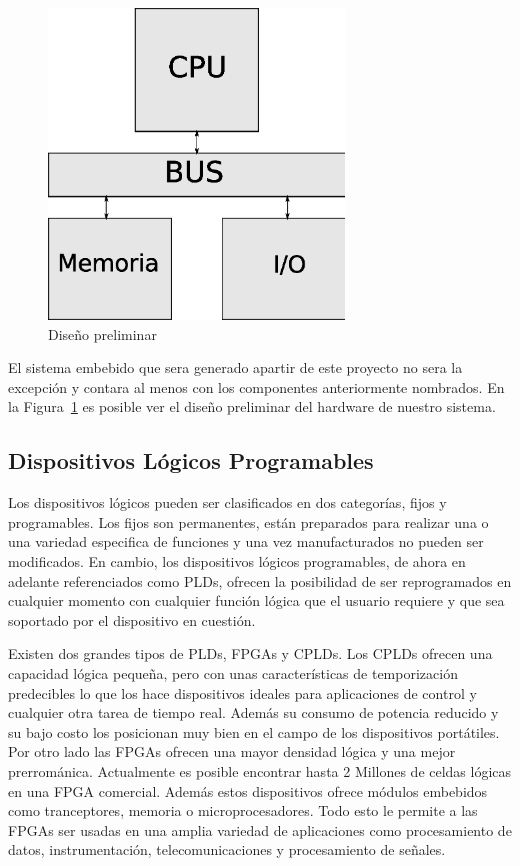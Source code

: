 \begin{figure}[h]
  \centering
	\includegraphics[width=0.70\textwidth]{2-sistema/graf/general.eps}
  \caption{Diseño preliminar}
  \label{figu:diseno}
\end{figure}

El sistema embebido que sera generado apartir de este proyecto no sera la excepción y contara al menos con los componentes anteriormente nombrados. En la Figura~\ref{figu:diseno} es posible ver el diseño preliminar del hardware de nuestro sistema.




\subsection{Dispositivos Lógicos Programables}
Los dispositivos lógicos pueden ser clasificados en dos categorías, fijos y programables. Los fijos son permanentes, están preparados para realizar una o una variedad especifica de funciones y una vez manufacturados no pueden ser modificados.
En cambio, los dispositivos lógicos programables, de ahora en adelante referenciados como PLDs, ofrecen la posibilidad de ser reprogramados en cualquier momento con cualquier función lógica que el usuario requiere y que sea soportado por el dispositivo en cuestión.	

Existen dos grandes tipos de PLDs, FPGAs y CPLDs. Los CPLDs ofrecen una capacidad lógica pequeña, pero con unas características de temporización predecibles lo que los hace dispositivos ideales para aplicaciones de control y cualquier otra tarea de tiempo real. Además su consumo de potencia reducido y su bajo costo los posicionan muy bien en el campo de los dispositivos portátiles.
Por otro lado las FPGAs ofrecen una mayor densidad lógica y una mejor prerrománica. Actualmente es posible encontrar hasta 2 Millones de celdas lógicas en una FPGA comercial. Además estos dispositivos ofrece módulos embebidos como tranceptores, memoria o microprocesadores. Todo esto le permite a las FPGAs ser usadas en una amplia variedad de aplicaciones como procesamiento de datos, instrumentación, telecomunicaciones y procesamiento de señales.

